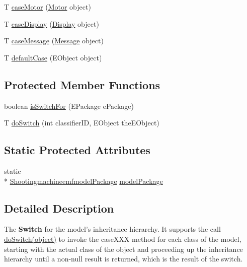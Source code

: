 \begin{DoxyCompactItemize}
T \hyperlink{classshootingmachineemfmodel_1_1util_1_1_shootingmachineemfmodel_switch_3_01_t_01_4_a0b3f23e9ef1cbcbc583eadab80c95eb2}{case\-Motor} (\hyperlink{interfaceshootingmachineemfmodel_1_1_motor}{Motor} object)
\item 
T \hyperlink{classshootingmachineemfmodel_1_1util_1_1_shootingmachineemfmodel_switch_3_01_t_01_4_a376376ba03305567263f7b31d9228d56}{case\-Display} (\hyperlink{interfaceshootingmachineemfmodel_1_1_display}{Display} object)
\item 
T \hyperlink{classshootingmachineemfmodel_1_1util_1_1_shootingmachineemfmodel_switch_3_01_t_01_4_ae0a44a549d6f6b0582c78bad499325a5}{case\-Message} (\hyperlink{interfaceshootingmachineemfmodel_1_1_message}{Message} object)
\item 
T \hyperlink{classshootingmachineemfmodel_1_1util_1_1_shootingmachineemfmodel_switch_3_01_t_01_4_a24899cc299de8c63154bb862c52bbefb}{default\-Case} (E\-Object object)
\end{DoxyCompactItemize}
\subsection*{Protected Member Functions}
\begin{DoxyCompactItemize}
\item 
boolean \hyperlink{classshootingmachineemfmodel_1_1util_1_1_shootingmachineemfmodel_switch_3_01_t_01_4_a047dcb6135236f02315a86c3213519fd}{is\-Switch\-For} (E\-Package e\-Package)
\item 
T \hyperlink{classshootingmachineemfmodel_1_1util_1_1_shootingmachineemfmodel_switch_3_01_t_01_4_a23186dd5b028dc2f72c38da4a98d587e}{do\-Switch} (int classifier\-I\-D, E\-Object the\-E\-Object)
\end{DoxyCompactItemize}
\subsection*{Static Protected Attributes}
\begin{DoxyCompactItemize}
\item 
static \\*
\hyperlink{interfaceshootingmachineemfmodel_1_1_shootingmachineemfmodel_package}{Shootingmachineemfmodel\-Package} \hyperlink{classshootingmachineemfmodel_1_1util_1_1_shootingmachineemfmodel_switch_3_01_t_01_4_a26a922643d840dd98a7add3fb526ed60}{model\-Package}
\end{DoxyCompactItemize}


\subsection{Detailed Description}
The {\bfseries Switch} for the model's inheritance hierarchy. It supports the call \hyperlink{}{do\-Switch(object)} to invoke the {\ttfamily case\-X\-X\-X} method for each class of the model, starting with the actual class of the object and proceeding up the inheritance hierarchy until a non-\/null result is returned, which is the result of the switch.

